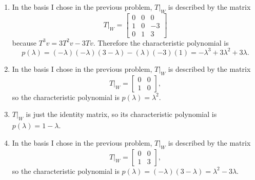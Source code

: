 \documentclass{article}
\begin{document}
\bigskip
\par
\begin{prob}
\end{prob}
\begin{enumerate}[label=(\alph*)]
    \item In the basis I chose in the previous problem, $T|_W$ is described by the matrix
        \[ T|_W = \begin{bmatrix}
            0 & 0 & 0 \\
            1 & 0 & -3 \\
            0 & 1 & 3
        \end{bmatrix} \]
        because $T^3 v = 3 T^2 v - 3 T v$. Therefore the characteristic polynomial is
        \[ p(\lambda) = (-\lambda)(-\lambda)(3-\lambda) - (\lambda)(-3)(1) = - \lambda^3 + 3 \lambda^2 + 3 \lambda. \]
    \item In the basis I chose in the previous problem, $T|_W$ is described by the matrix
        \[ T|_W = \begin{bmatrix}
            0 & 0 \\
            1 & 0
        \end{bmatrix}, \]
        so the characteristic polynomial is $p(\lambda) = \lambda^2$.
    \item $T|_W$ is just the identity matrix, so its characteristic polynomial is $p(\lambda) = 1 - \lambda$.
    \item In the basis I chose in the previous problem, $T|_W$ is described by the matrix
        \[ T|_W = \begin{bmatrix}
            0 & 0 \\
            1 & 3
        \end{bmatrix}, \]
        so the characteristic polynomial is $p(\lambda) = (-\lambda)(3-\lambda)=\lambda^2-3\lambda$.
\end{enumerate}
\end{document}
